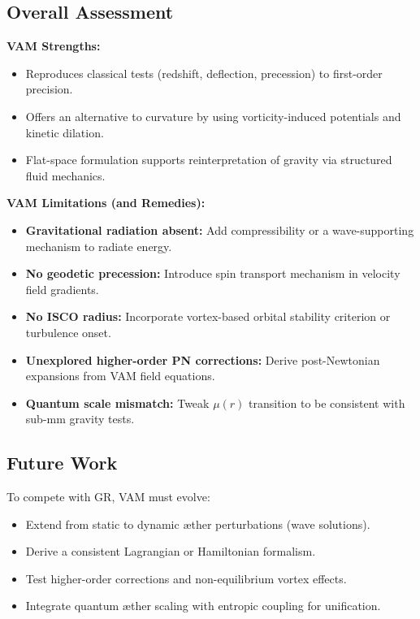 \vspace{1em}

\subsection*{Overall Assessment}

\textbf{VAM Strengths:}
\begin{itemize}
    \item Reproduces classical tests (redshift, deflection, precession) to first-order precision.
    \item Offers an alternative to curvature by using vorticity-induced potentials and kinetic dilation.
    \item Flat-space formulation supports reinterpretation of gravity via structured fluid mechanics.
\end{itemize}

\textbf{VAM Limitations (and Remedies):}
\begin{itemize}
    \item \textbf{Gravitational radiation absent:} Add compressibility or a wave-supporting mechanism to radiate energy.
    \item \textbf{No geodetic precession:} Introduce spin transport mechanism in velocity field gradients.
    \item \textbf{No ISCO radius:} Incorporate vortex-based orbital stability criterion or turbulence onset.
    \item \textbf{Unexplored higher-order PN corrections:} Derive post-Newtonian expansions from VAM field equations.
    \item \textbf{Quantum scale mismatch:} Tweak $\mu(r)$ transition to be consistent with sub-mm gravity tests.
\end{itemize}

\subsection*{Future Work}

To compete with GR, VAM must evolve:
\begin{itemize}
    \item Extend from static to dynamic æther perturbations (wave solutions).
    \item Derive a consistent Lagrangian or Hamiltonian formalism.
    \item Test higher-order corrections and non-equilibrium vortex effects.
    \item Integrate quantum æther scaling with entropic coupling for unification.
\end{itemize}

